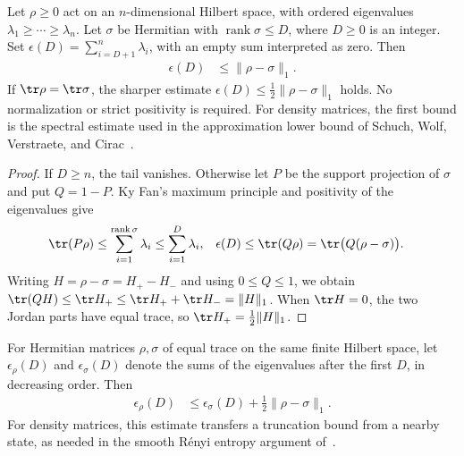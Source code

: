 \begin{theorem}
  \label{thm:spectral_tail_trace_norm}
  \leanok
  Let $\rho\ge0$ act on an $n$-dimensional Hilbert space, with ordered
  eigenvalues $\lambda_1\ge\cdots\ge\lambda_n$. Let $\sigma$ be Hermitian
  with $\operatorname{rank}\sigma\le D$, where $D\ge0$ is an integer.
  Set $\epsilon(D)=\sum_{i=D+1}^n\lambda_i$, with an empty sum interpreted
  as zero. Then
  \begin{align}
    \epsilon(D)&\le\lVert\rho-\sigma\rVert_1.
  \end{align}
  If $\tr\rho=\tr\sigma$, the sharper estimate
  $\epsilon(D)\le\frac12\lVert\rho-\sigma\rVert_1$ holds.
  No normalization or strict positivity is required. For density matrices,
  the first bound is the spectral estimate used in the approximation lower
  bound of Schuch, Wolf, Verstraete, and Cirac~\cite{Schuch2008EntropyScaling}.
\end{theorem}

\begin{proof}\leanok
  If $D\ge n$, the tail vanishes. Otherwise let $P$ be the support
  projection of $\sigma$ and put $Q=1-P$. Ky Fan's maximum principle and
  positivity of the eigenvalues give
  \begin{align}
    \tr(P\rho)&\le\sum_{i=1}^{\operatorname{rank}\sigma}\lambda_i
      \le\sum_{i=1}^D\lambda_i, &
    \epsilon(D)&\le\tr(Q\rho)=\tr\bigl(Q(\rho-\sigma)\bigr).
  \end{align}
  Writing $H=\rho-\sigma=H_+-H_-$ and using $0\le Q\le1$, we obtain
  $\tr(QH)\le\tr H_+\le\tr H_++\tr H_-=\lVert H\rVert_1$.
  When $\tr H=0$, the two Jordan parts have equal trace, so
  $\tr H_+=\frac12\lVert H\rVert_1$.
\end{proof}

\begin{theorem}
  \label{thm:spectral_tail_stability}
  \leanok
  For Hermitian matrices $\rho,\sigma$ of equal trace on the same finite
  Hilbert space, let $\epsilon_\rho(D)$ and $\epsilon_\sigma(D)$ denote the
  sums of the eigenvalues after the first $D$, in decreasing order. Then
  \begin{align}
    \epsilon_\rho(D)&\le\epsilon_\sigma(D)
      +\frac12\lVert\rho-\sigma\rVert_1.
  \end{align}
  For density matrices, this estimate transfers a truncation bound from a
  nearby state, as needed in the smooth R\'enyi entropy argument
  of~\cite{Schuch2008EntropyScaling}.
\end{theorem}

